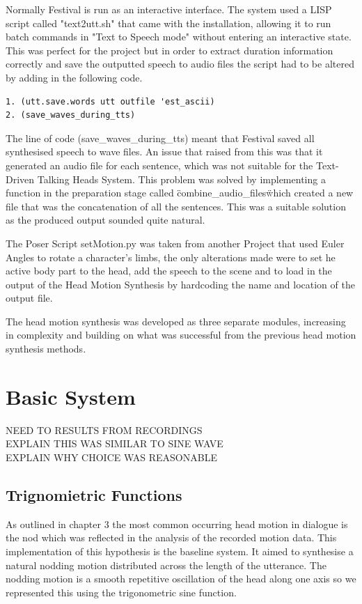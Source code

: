 \documentclass[bsc,frontabs,twoside,singlespacing,parskip]{infthesis}
\begin{document}
Normally Festival is run as an interactive interface. The system used a LISP script called "text2utt.sh" that came with the installation, allowing it to run batch commands in "Text to Speech mode" without entering an interactive state. This was perfect for the project but in order to extract duration information correctly and save the outputted speech to audio files the script had to be altered by adding in the following code. 

\begin{lstlisting}
1. (utt.save.words utt outfile 'est_ascii) 
2. (save_waves_during_tts)
\end{lstlisting}

The line of code (save\_waves\_during\_tts) meant that Festival saved all synthesised speech to wave files. An issue that raised from this was that it generated an audio file for each sentence, which was not suitable for the Text-Driven Talking Heads System. This problem was solved by implementing a function in the preparation stage called \"combine\_audio\_files\" which created a new file that was the concatenation of all the sentences. This was a suitable solution as the produced output sounded quite natural.

The Poser Script setMotion.py was taken from another Project that used Euler Angles to rotate a character's limbs, the only alterations made were to set he active body part to the head, add the speech to the scene and to load in the output of the Head Motion Synthesis by hardcoding the name and location of the output file.

The head motion synthesis was developed as three separate modules, increasing in complexity and building on what was successful from the previous head motion synthesis methods.

\section{Basic System} 

NEED TO RESULTS FROM RECORDINGS \\
EXPLAIN THIS WAS SIMILAR TO SINE WAVE \\
EXPLAIN WHY CHOICE WAS REASONABLE \\

\subsection{Trignomietric Functions}

As outlined in chapter 3 the most common occurring head motion in dialogue is the nod which was reflected in the analysis of the recorded motion data. This implementation of this hypothesis is the baseline system. It aimed to synthesise a natural nodding motion distributed across the length of the utterance. The nodding motion is a smooth repetitive oscillation of the head along one axis so we represented this using the trigonometric sine function. 
\end{document}
